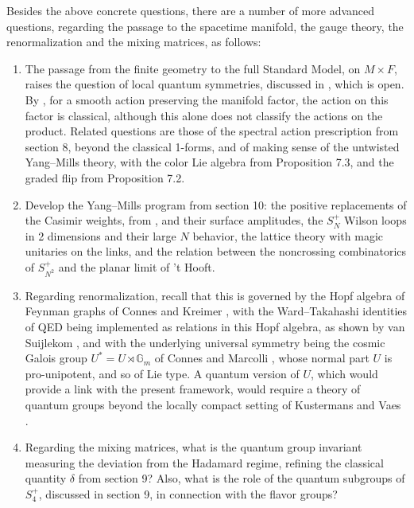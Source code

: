 \documentclass[11pt]{amsart}
\theoremstyle{definition}
\begin{document}
Besides the above concrete questions, there are a number of more advanced questions, regarding the passage to the spacetime manifold, the gauge theory, the renormalization and the mixing matrices, as follows:

\begin{enumerate}
\item The passage from the finite geometry to the full Standard Model, on $M\times F$, raises the question of local quantum symmetries, discussed in \cite{bddd}, which is open. By \cite{gsw}, for a smooth action preserving the manifold factor, the action on this factor is classical, although this alone does not classify the actions on the product. Related questions are those of the spectral action prescription from section 8, beyond the classical 1-forms, and of making sense of the untwisted Yang--Mills theory, with the color Lie algebra from Proposition 7.3, and the graded flip from Proposition 7.2.

\item Develop the Yang--Mills program from section 10: the positive replacements of the Casimir weights, from \cite{fks}, and their surface amplitudes, the $S_N^+$ Wilson loops in 2 dimensions and their large $N$ behavior, the lattice theory with magic unitaries on the links, and the relation between the noncrossing combinatorics of $S_{N^2}^+$ and the planar limit of 't Hooft.

\item Regarding renormalization, recall that this is governed by the Hopf algebra of Feynman graphs of Connes and Kreimer \cite{ck1,ck2}, with the Ward--Takahashi identities of QED being implemented as relations in this Hopf algebra, as shown by van Suijlekom \cite{vs2}, and with the underlying universal symmetry being the cosmic Galois group $U^*=U\rtimes\mathbb G_m$ of Connes and Marcolli \cite{cm}, whose normal part $U$ is pro-unipotent, and so of Lie type. A quantum version of $U$, which would provide a link with the present framework, would require a theory of quantum groups beyond the locally compact setting of Kustermans and Vaes \cite{kva}.

\item Regarding the mixing matrices, what is the quantum group invariant measuring the deviation from the Hadamard regime, refining the classical quantity $\delta$ from section 9? Also, what is the role of the quantum subgroups of $S_4^+$, discussed in section 9, in connection with the flavor groups?
\end{enumerate}
\end{document}
